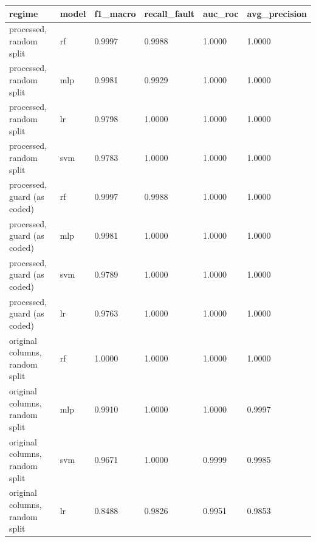 \begin{tabular}{llllll}
\toprule
regime & model & f1\_macro & recall\_fault & auc\_roc & avg\_precision \\
\midrule
processed, random split & rf & 0.9997 & 0.9988 & 1.0000 & 1.0000 \\
processed, random split & mlp & 0.9981 & 0.9929 & 1.0000 & 1.0000 \\
processed, random split & lr & 0.9798 & 1.0000 & 1.0000 & 1.0000 \\
processed, random split & svm & 0.9783 & 1.0000 & 1.0000 & 1.0000 \\
processed, guard (as coded) & rf & 0.9997 & 0.9988 & 1.0000 & 1.0000 \\
processed, guard (as coded) & mlp & 0.9981 & 1.0000 & 1.0000 & 1.0000 \\
processed, guard (as coded) & svm & 0.9789 & 1.0000 & 1.0000 & 1.0000 \\
processed, guard (as coded) & lr & 0.9763 & 1.0000 & 1.0000 & 1.0000 \\
original columns, random split & rf & 1.0000 & 1.0000 & 1.0000 & 1.0000 \\
original columns, random split & mlp & 0.9910 & 1.0000 & 1.0000 & 0.9997 \\
original columns, random split & svm & 0.9671 & 1.0000 & 0.9999 & 0.9985 \\
original columns, random split & lr & 0.8488 & 0.9826 & 0.9951 & 0.9853 \\
\bottomrule
\end{tabular}

